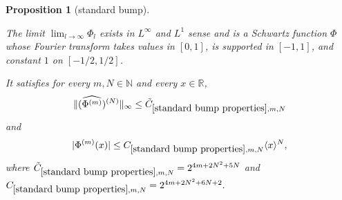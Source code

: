 \documentclass[12pt,reqno]{amsart}
\theoremstyle{plain}
\newtheorem{proposition}[theorem]{Proposition}
\numberwithin{equation}{section}
\theoremstyle{remark}
\newcommand{\uses}[1]{}
\newcommand{\usesdefs}[1]{}
\newcommand{\leanok}{}
\newcommand{\lean}[1]{}
\newcommand{\R}{{\mathbb R}}
\newcommand{\N}{{\mathbb N}}
\begin{document}
\begin{proposition}[standard bump]\label{standard bump properties}\uses{lem:smoothdecay2}\usesdefs{bracket bump,standard bump}
\lean{Auto.standardBumpProperties,Auto.standardBumpProperties_l1Convergence,Auto.standardBumpProperties_linfConvergence,Auto.standardBumpProperties_schwartz,Auto.standardBumpProperties_fourierShape,Auto.standardBumpProperties_fourierDerivativeEstimate,Auto.standardBumpProperties_derivativeDecay}
\leanok
The limit $\lim_{l\to \infty} \Phi_l$ exists in $L^\infty$  and $L^1$ sense and is a Schwartz function $\Phi$
whose Fourier transform takes values in $[0,1]$, is supported in $[-1,1]$, and constant $1$
on $[-1/2,1/2]$.

It satisfies for every $m,N\in\N$ and every $x\in\R$,
\begin{equation}
    \label{Phi_derbound}
    \|  (\widehat{\Phi^{(m)}})^{(N)}  \|_\infty \le \tilde{C}_{\ref{standard bump properties},m,N}
\end{equation}
and
\begin{equation}\label{auto:standard-bump-derivative-decay} |\Phi^{(m)}(x)| \le C_{\ref{standard bump properties},m,N} \langle x\rangle^N, \end{equation}
where $\tilde{C}_{\ref{standard bump properties},m,N}=2^{4m + 2N^2 + 5N}$ and $C_{\ref{standard bump properties},m,N}=2^{4m+2N^2+6N+2}.$
\end{proposition}
\end{document}
